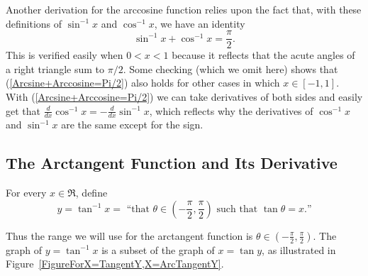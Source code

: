 Another derivation for the arccosine function relies upon the
fact that, with these definitions of $\sin^{-1}x$ and 
$\cos^{-1}x$, we have an identity
\begin{equation}\sin^{-1}x+\cos^{-1}x=\frac{\pi}2.
\label{Arcsine+Arccosine=Pi/2}
\end{equation}
This is verified easily when $0<x<1$ because it reflects that
the acute angles of a right triangle sum to $\pi/2$.  
Some checking (which we omit here) shows that 
(\ref{Arcsine+Arccosine=Pi/2}) also holds for other cases in
which $x\in[-1,1]$.  With (\ref{Arcsine+Arccosine=Pi/2})
we can take derivatives of both sides and easily
get that $\frac{d}{dx}\cos^{-1}x
=-\frac{d}{dx}\sin^{-1}x$, which reflects why the derivatives 
of $\cos^{-1}x$ and $\sin^{-1}x$ are the same except for the
sign.



\subsection{The Arctangent Function and Its Derivative}
\begin{definition} For every $x\in\Re$, define
\begin{equation}y=\tan^{-1}x=\text{ ``that }\theta\in\left(-\frac{\pi}2,
           \frac{\pi}2\right)\text{ such that }\tan\theta=x.\text{''}
       \label{EquationDefiningArctangent}
\end{equation}
\label{DefinitionOfArctangent}
\end{definition}

\noindent
Thus the range we will use for the arctangent function
is $\theta\in\left(-\frac{\pi}2,\frac{\pi}2\right)$.
The graph of $y=\tan^{-1}x$ is a subset of the graph of
$x=\tan y$, as illustrated in Figure~\ref{FigureForX=TangentY,X=ArcTangentY}.


